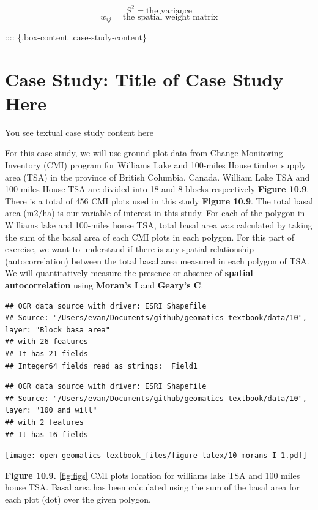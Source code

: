 \documentclass[
]{book}
\begin{document}
\[S^2=\text{the variance}\]
\[w_{ij}=\text{the spatial weight matrix}\]

:::: \{.box-content .case-study-content\}

\hypertarget{case-study-title-of-case-study-here-2}{%
\section{Case Study: Title of Case Study Here}\label{case-study-title-of-case-study-here-2}}

You see textual case study content here

For this case study, we will use ground plot data from Change Monitoring Inventory (CMI) program \citep[for details:][]{ProvinceofBC2018} for Williams Lake and 100-miles House timber supply area (TSA) in the province of British Columbia, Canada. William Lake TSA and 100-miles House TSA are divided into 18 and 8 blocks respectively \textbf{Figure 10.9}. There is a total of 456 CMI plots used in this study \textbf{Figure 10.9}. The total basal area (m2/ha) is our variable of interest in this study. For each of the polygon in Williams lake and 100-miles house TSA, total basal area was calculated by taking the sum of the basal area of each CMI plots in each polygon. For this part of exercise, we want to understand if there is any spatial relationship (autocorrelation) between the total basal area measured in each polygon of TSA. We will quantitatively measure the presence or absence of \textbf{spatial autocorrelation} using \textbf{Moran's I} and \textbf{Geary's C}.

\begin{verbatim}
## OGR data source with driver: ESRI Shapefile 
## Source: "/Users/evan/Documents/github/geomatics-textbook/data/10", layer: "Block_basa_area"
## with 26 features
## It has 21 fields
## Integer64 fields read as strings:  Field1
\end{verbatim}

\begin{verbatim}
## OGR data source with driver: ESRI Shapefile 
## Source: "/Users/evan/Documents/github/geomatics-textbook/data/10", layer: "100_and_will"
## with 2 features
## It has 16 fields
\end{verbatim}

\texttt{[image: open-geomatics-textbook\_files/figure-latex/10-morans-I-1.pdf]}

\textbf{Figure 10.9.} \ref{fig:figs} CMI plots location for williams lake TSA and 100 miles house TSA. Basal area has been calculated using the sum of the basal area for each plot (dot) over the given polygon.
\end{document}
